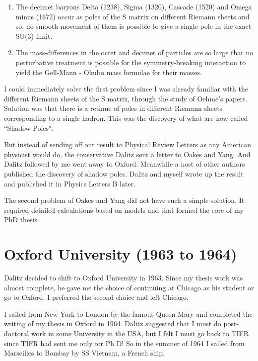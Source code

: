 \begin{enumerate}
\itemsep=0pt
\item The decimet baryons Delta (1238), Sigma (1320), Cascade (1520) and 
Omega minus (1672) occur as poles of the S matrix on different Riemann 
sheets and so, no smooth movement of them is possible to give a single 
pole in the exact SU(3) limit.

\item The mass-differences in the octet and decimet of particles are so 
large that no perturbative treatment is possible for the 
symmetry-breaking interaction to yield the Gell-Mann - Okubo mass 
formulae for their masses.
\end{enumerate}
\vspace{-\topsep}
I could immediately solve the first problem since I was already familiar 
with the different Riemann sheets of the S matrix, thro\-ugh the study of 
Oehme's papers. Solution was that there is a retinue of poles in 
different Riemann sheets corresponding to a single hadron. This was the 
discovery of what are now called ``Shadow Poles".

But instead of sending off our result to Physical Review Le\-tters as any 
American physicist would do, the conservative Dalitz sent a letter to 
Oakes and Yang. And Dalitz followed by me went away to Oxford. Meanwhile 
a host of other authors published the discovery of shadow poles. Dalitz 
and myself wrote up the result and published it in Physics Letters B 
later.

The second problem of Oakes and Yang did not have such a simple 
solution. It required detailed calculations based on mode\-ls and that 
formed the core of my PhD thesis.

\vspace{-\topsep}
\section*{Oxford University (1963 to 1964)}
\vskip -10pt

Dalitz decided to shift to Oxford University in 1963. Since my thesis 
work was almost complete, he gave me the choice of conti\-nuing at Chicago 
as his student or go to Oxford. I preferred the second choice and left 
Chicago.

I sailed from New York to London by the famous Queen Mary and completed 
the writing of my thesis in Oxford in 1964. Dalitz suggested that I must 
do post-doctoral work in some University in the USA, but I felt I must go 
back to TIFR since TIFR had sent me only for Ph D! So in the summer of 
1964 I sailed from Marseilles to Bombay by SS Vietnam, a French ship.

